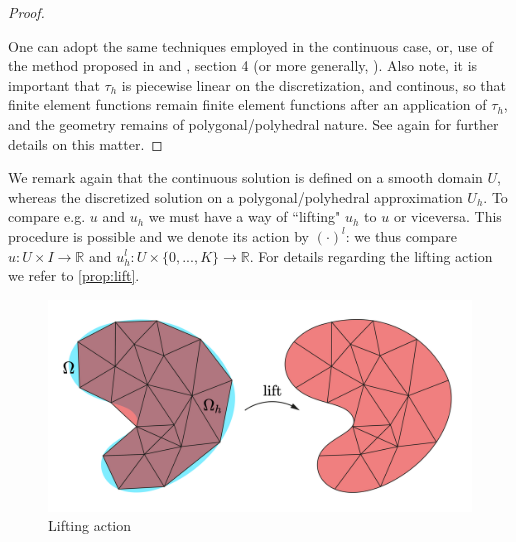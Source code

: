 \documentclass[english,a4paper,9pt,oneside]{scrbook}	%
\theoremstyle{break}
\newenvironment{mproof}[1][\proofname]{%
  \begin{proof}[#1]$ $\par\nobreak\ignorespaces
}{%
  \end{proof}
}
\renewcommand*{\proofname}{Proof}
\theoremstyle{remark}
\newcommand{\mR}{\mathbb{R}}
\begin{document}
\begin{mproof}
One can adopt the same techniques employed in the continuous case, or, use of the method proposed in and \cite{lindemann2}, section 4 (or more generally, \cite{lindemann}).
Also note, it is important that $\tau_h$ is piecewise linear on the discretization, and continous, so that finite element functions remain finite element functions after an application of $\tau_h$, and the geometry remains of polygonal/polyhedral nature. See again \cite{lindemann2} for further details on this matter.
\end{mproof}


We remark again that the continuous solution is defined on a smooth domain $U$, whereas the discretized solution on a polygonal/polyhedral approximation $U_h$. To compare e.g. $u$ and $u_h$ we must have a way of ``lifting" $u_h$ to $u$ or viceversa. This procedure is possible and we denote its action by $(\cdot)^l$: we thus compare $u: U\times I \rightarrow \mR$ and $u_h^l:U\times\{0,...,K\}\rightarrow \mR$. For details regarding the lifting action we refer to \cref{prop:lift}.

\begin{figure}[H]
\centering
\includegraphics[width=0.4\columnwidth]{Images/Lift.pdf}
\caption{Lifting action}\label{fig:lift}
\end{figure}
\end{document}
